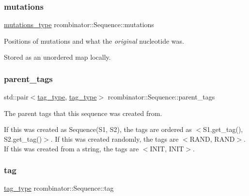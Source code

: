 \subsubsection{\texorpdfstring{mutations}{mutations}}
{\footnotesize\ttfamily \mbox{\hyperlink{classrcombinator_1_1Sequence_a4adff5141a0bf95a89b350ef5008000d}{mutations\+\_\+type}} rcombinator\+::\+Sequence\+::mutations\hspace{0.3cm}{\ttfamily [private]}}



Positions of mutations and what the {\itshape original} nucleotide was. 

Stored as an unordered map locally. \mbox{\label{classrcombinator_1_1Sequence_a81a264faf65b131fe857511680b5aa25}} 
\subsubsection{\texorpdfstring{parent\+\_\+tags}{parent\_tags}}
{\footnotesize\ttfamily std\+::pair$<$\mbox{\hyperlink{constants_8h_a3e6daf1646e952257330d8cfe20e96f8}{tag\+\_\+type}}, \mbox{\hyperlink{constants_8h_a3e6daf1646e952257330d8cfe20e96f8}{tag\+\_\+type}}$>$ rcombinator\+::\+Sequence\+::parent\+\_\+tags\hspace{0.3cm}{\ttfamily [private]}}



The parent tags that this sequence was created from. 

If this was created as Sequence(\+S1, S2), the tags are ordered as $<$S1.\+get\+\_\+tag(), S2.\+get\+\_\+tag()$>$. If this was created randomly, the tags are $<$R\+A\+ND, R\+A\+ND$>$. If this was created from a string, the tags are $<$I\+N\+IT, I\+N\+IT$>$. \mbox{\label{classrcombinator_1_1Sequence_a6f20589d14483addafdc75aa9448c2a2}} 
\subsubsection{\texorpdfstring{tag}{tag}}
{\footnotesize\ttfamily \mbox{\hyperlink{constants_8h_a3e6daf1646e952257330d8cfe20e96f8}{tag\+\_\+type}} rcombinator\+::\+Sequence\+::tag\hspace{0.3cm}{\ttfamily [private]}}




